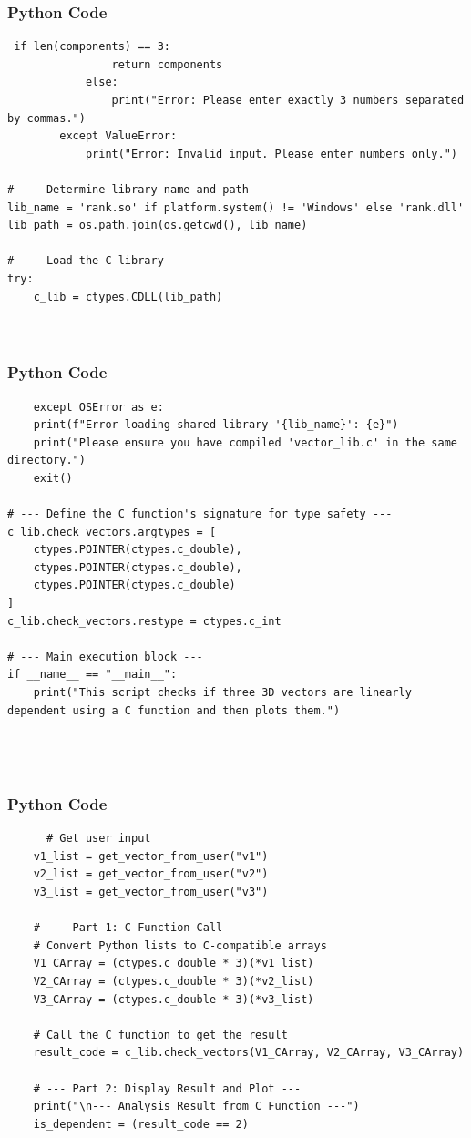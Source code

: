 \documentclass{beamer}
\begin{document}
    \begin{frame}[fragile]
        \frametitle{Python Code}
        \begin{lstlisting}
 if len(components) == 3:
                return components
            else:
                print("Error: Please enter exactly 3 numbers separated by commas.")
        except ValueError:
            print("Error: Invalid input. Please enter numbers only.")

# --- Determine library name and path ---
lib_name = 'rank.so' if platform.system() != 'Windows' else 'rank.dll'
lib_path = os.path.join(os.getcwd(), lib_name)

# --- Load the C library ---
try:
    c_lib = ctypes.CDLL(lib_path)

   
        \end{lstlisting}
    \end{frame}
    
    \begin{frame}[fragile]
        \frametitle{Python Code}
        \begin{lstlisting}
    except OSError as e:
    print(f"Error loading shared library '{lib_name}': {e}")
    print("Please ensure you have compiled 'vector_lib.c' in the same directory.")
    exit()

# --- Define the C function's signature for type safety ---
c_lib.check_vectors.argtypes = [
    ctypes.POINTER(ctypes.c_double),
    ctypes.POINTER(ctypes.c_double),
    ctypes.POINTER(ctypes.c_double)
]
c_lib.check_vectors.restype = ctypes.c_int

# --- Main execution block ---
if __name__ == "__main__":
    print("This script checks if three 3D vectors are linearly dependent using a C function and then plots them.")
    
   
   
        \end{lstlisting}
    \end{frame}
    
    \begin{frame}[fragile]
        \frametitle{Python Code}
        \begin{lstlisting}
      # Get user input
    v1_list = get_vector_from_user("v1")
    v2_list = get_vector_from_user("v2")
    v3_list = get_vector_from_user("v3")

    # --- Part 1: C Function Call ---
    # Convert Python lists to C-compatible arrays
    V1_CArray = (ctypes.c_double * 3)(*v1_list)
    V2_CArray = (ctypes.c_double * 3)(*v2_list)
    V3_CArray = (ctypes.c_double * 3)(*v3_list)

    # Call the C function to get the result
    result_code = c_lib.check_vectors(V1_CArray, V2_CArray, V3_CArray)
    
    # --- Part 2: Display Result and Plot ---
    print("\n--- Analysis Result from C Function ---")
    is_dependent = (result_code == 2)
    
  

        \end{lstlisting}
    \end{frame}
\end{document}
